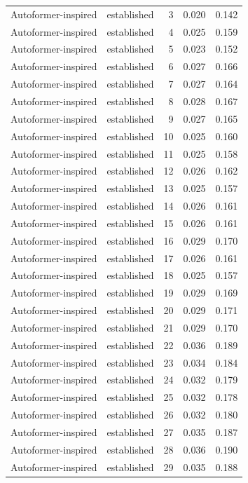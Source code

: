\begin{tabular}{llrrr}
Autoformer-inspired & established & 3 & 0.020 & 0.142 \\
Autoformer-inspired & established & 4 & 0.025 & 0.159 \\
Autoformer-inspired & established & 5 & 0.023 & 0.152 \\
Autoformer-inspired & established & 6 & 0.027 & 0.166 \\
Autoformer-inspired & established & 7 & 0.027 & 0.164 \\
Autoformer-inspired & established & 8 & 0.028 & 0.167 \\
Autoformer-inspired & established & 9 & 0.027 & 0.165 \\
Autoformer-inspired & established & 10 & 0.025 & 0.160 \\
Autoformer-inspired & established & 11 & 0.025 & 0.158 \\
Autoformer-inspired & established & 12 & 0.026 & 0.162 \\
Autoformer-inspired & established & 13 & 0.025 & 0.157 \\
Autoformer-inspired & established & 14 & 0.026 & 0.161 \\
Autoformer-inspired & established & 15 & 0.026 & 0.161 \\
Autoformer-inspired & established & 16 & 0.029 & 0.170 \\
Autoformer-inspired & established & 17 & 0.026 & 0.161 \\
Autoformer-inspired & established & 18 & 0.025 & 0.157 \\
Autoformer-inspired & established & 19 & 0.029 & 0.169 \\
Autoformer-inspired & established & 20 & 0.029 & 0.171 \\
Autoformer-inspired & established & 21 & 0.029 & 0.170 \\
Autoformer-inspired & established & 22 & 0.036 & 0.189 \\
Autoformer-inspired & established & 23 & 0.034 & 0.184 \\
Autoformer-inspired & established & 24 & 0.032 & 0.179 \\
Autoformer-inspired & established & 25 & 0.032 & 0.178 \\
Autoformer-inspired & established & 26 & 0.032 & 0.180 \\
Autoformer-inspired & established & 27 & 0.035 & 0.187 \\
Autoformer-inspired & established & 28 & 0.036 & 0.190 \\
Autoformer-inspired & established & 29 & 0.035 & 0.188 \\

\end{tabular}
